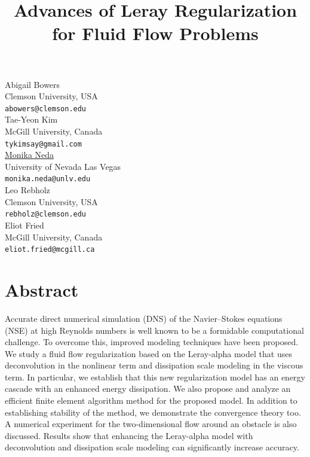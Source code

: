 \documentclass[article, A4, 11pt]{llncs}%
\begin{document}
\title{Advances of Leray Regularization for Fluid Flow Problems}
 \author{} \institute{}
\maketitle
\begin{center}
{\large Abigail Bowers}\\
Clemson University, USA\\
{\tt abowers@clemson.edu}
\\ \vspace{4mm}
{\large Tae-Yeon  Kim}\\
McGill University, Canada\\
{\tt tykimsay@gmail.com}
\\ \vspace{4mm}
{\large \underline{Monika Neda}}\\
University of Nevada Las Vegas\\
{\tt monika.neda@unlv.edu}
\\ \vspace{4mm}
{\large Leo Rebholz}\\
Clemson University, USA\\
{\tt rebholz@clemson.edu}
\\ \vspace{4mm}
{\large Eliot  Fried}\\
McGill University, Canada\\
{\tt eliot.fried@mcgill.ca}
\end{center}

\section*{Abstract}
Accurate direct numerical simulation (DNS) of the Navier–Stokes equations (NSE) at high Reynolds numbers is well known to be a formidable computational challenge. To overcome this, improved modeling techniques have been proposed. We study a fluid flow regularization based on the Leray-alpha model that uses deconvolution in the nonlinear term and dissipation scale modeling in the viscous term. In particular, we establish that this new regularization model has an energy cascade with an enhanced energy dissipation. We also propose and analyze an efficient finite element algorithm method for the proposed model. In addition to establishing stability of the method, we demonstrate the convergence theory too. A numerical experiment for the two-dimensional flow around an obstacle is also discussed. Results show that enhancing the Leray-alpha model with deconvolution and dissipation scale modeling can significantly increase accuracy.
\end{document}
